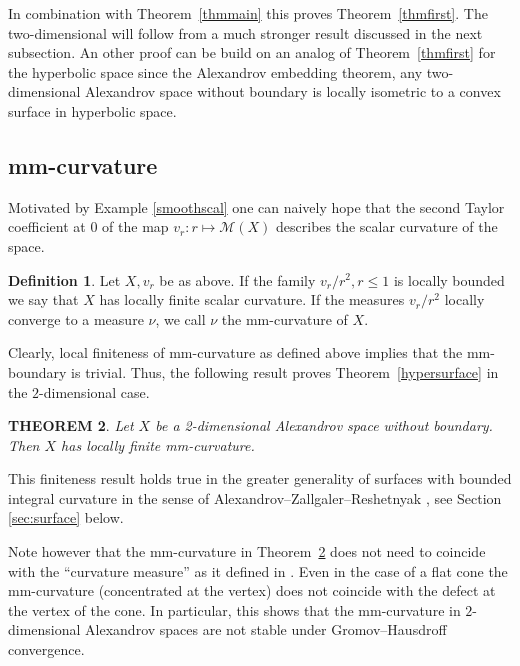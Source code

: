 \documentclass[12pt,leqno]{amsart}
\numberwithin{equation}{section}
\newtheorem{thm}{THEOREM}[section]
\theoremstyle{definition}
\newtheorem{defn}[thm]{Definition}%
\theoremstyle{remark}
\newcommand{\tref}[1]{Theorem~\ref{#1}}
\begin{document}
In combination with \tref{thmmain} this proves \tref{thmfirst}. 
The two-dimensional 
will follow from a much stronger result discussed in the next subsection.
An other proof can be build on an analog of \tref{thmfirst} for the hyperbolic space
since the Alexandrov embedding theorem, any two-dimensional Alexandrov space without boundary
is locally isometric to a convex surface in hyperbolic space.



\subsection{mm-curvature}
Motivated by Example \ref{smoothscal} one can naively hope that the second Taylor coefficient at $0$ of the
map $v_r\colon r\mapsto \mathcal M(X)$ describes the scalar curvature of the space.



\begin{defn}
 Let $X,v_r$ be as above. If the family $v_r /r^2, r\leq 1$ is locally bounded we say that $X$ has locally finite  scalar curvature.
  If the measures $v_r /r^2$ locally converge to a measure $\nu$, we call $\nu$ the mm-curvature of $X$.
\end{defn}


Clearly, local finiteness of mm-curvature as defined above implies that the mm-boundary is trivial.
Thus, the following result proves \tref{hypersurface} in the $2$-dimensional case.


\begin{thm} \label{intsurface}
 Let $X$ be a 2-dimensional Alexandrov space without boundary.
 Then $X$ has locally finite mm-curvature.
\end{thm}


This finiteness result holds true in the greater generality of surfaces  with bounded integral curvature in the sense of Alexandrov--Zallgaler--Reshetnyak \cite{Reshetnyak-GeomIV}, see Section \ref{sec:surface} below. 

Note however that the mm-curvature
in \tref{intsurface} does not need to coincide with the ``curvature measure'' as it defined in \cite{Reshetnyak-GeomIV}.  Even in the case of a flat cone the mm-curvature (concentrated at the vertex) does not coincide with the defect at the vertex of the cone.  In particular, this shows that the mm-curvature in $2$-dimensional Alexandrov spaces are not stable under Gromov--Hausdroff convergence.
\end{document}

